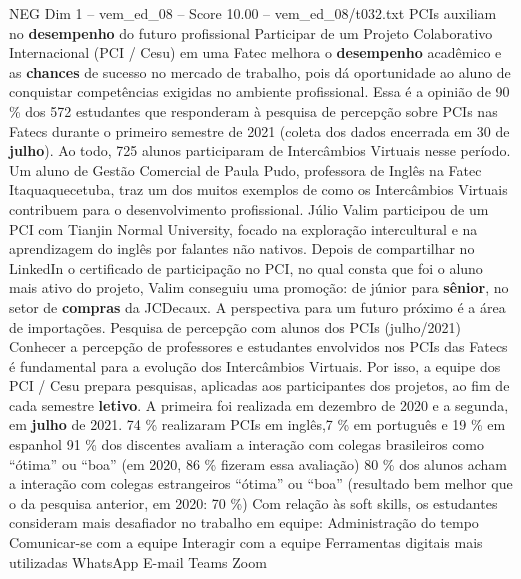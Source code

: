 \begin{textsample}{NEG Dim 1 – vem\_ed\_08 – Score 10.00 – vem\_ed\_08/t032.txt}  \label{ex:f1_neg_123}
PCIs auxiliam no \textbf{desempenho} do futuro profissional Participar de um Projeto Colaborativo Internacional (PCI / Cesu) em uma Fatec melhora o \textbf{desempenho} acadêmico e as \textbf{chances} de sucesso no mercado de trabalho, pois dá oportunidade ao aluno de conquistar competências exigidas no ambiente profissional.
Essa é a opinião de 90 \% dos 572 estudantes que responderam à pesquisa de percepção sobre PCIs nas Fatecs durante o primeiro semestre de 2021 (coleta dos dados encerrada em 30 de \textbf{julho}).
Ao todo, 725 alunos participaram de Intercâmbios Virtuais nesse período.
Um aluno de Gestão Comercial de Paula Pudo, professora de Inglês na Fatec Itaquaquecetuba, traz um dos muitos exemplos de como os Intercâmbios Virtuais contribuem para o desenvolvimento profissional.
Júlio Valim participou de um PCI com Tianjin Normal University, focado na exploração intercultural e na aprendizagem do inglês por falantes não nativos.
Depois de compartilhar no LinkedIn o certificado de participação no PCI, no qual consta que foi o aluno mais ativo do projeto, Valim conseguiu uma promoção: de júnior para \textbf{sênior}, no setor de \textbf{compras} da JCDecaux.
A perspectiva para um futuro próximo é a área de importações.
Pesquisa de percepção com alunos dos PCIs (julho/2021) Conhecer a percepção de professores e estudantes envolvidos nos PCIs das Fatecs é fundamental para a evolução dos Intercâmbios Virtuais.
Por isso, a equipe dos PCI / Cesu prepara pesquisas, aplicadas aos participantes dos projetos, ao fim de cada semestre \textbf{letivo}.
A primeira foi realizada em dezembro de 2020 e a segunda, em \textbf{julho} de 2021. 74 \% realizaram PCIs em inglês,7 \% em português e 19 \% em espanhol 91 \% dos discentes avaliam a interação com colegas brasileiros como “ótima” ou “boa” (em 2020, 86 \% fizeram essa avaliação) 80 \% dos alunos acham a interação com colegas estrangeiros “ótima” ou “boa” (resultado bem melhor que o da pesquisa anterior, em 2020: 70 \%) Com relação às soft skills, os estudantes consideram mais desafiador no trabalho em equipe: Administração do tempo Comunicar-se com a equipe Interagir com a equipe Ferramentas digitais mais utilizadas WhatsApp E-mail Teams Zoom

\end{textsample}
